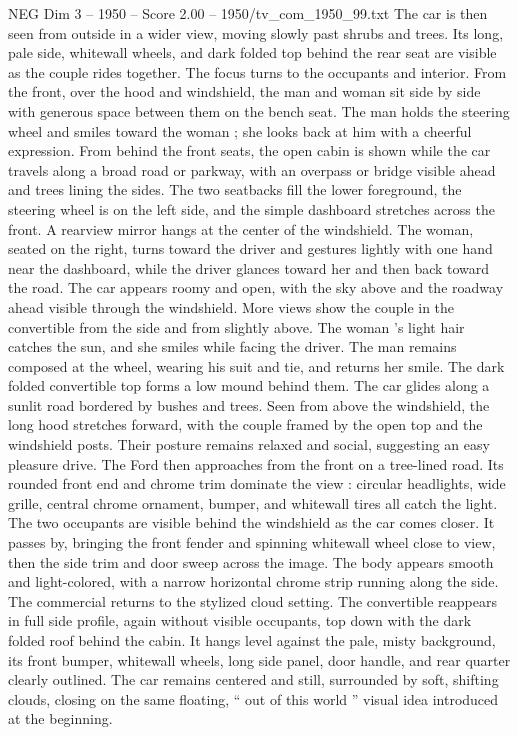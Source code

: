 \begin{textsample}{NEG Dim 3 – 1950 – Score 2.00 – 1950/tv\_com\_1950\_99.txt}
The car is then seen from outside in a wider view, moving slowly past shrubs and trees.
Its long, pale side, whitewall wheels, and dark folded top behind the rear seat are visible as the couple rides together.
The focus turns to the occupants and interior.
From the front, over the hood and windshield, the man and woman sit side by side with generous space between them on the bench seat.
The man holds the steering wheel and smiles toward the woman ; she looks back at him with a cheerful expression.
From behind the front seats, the open cabin is shown while the car travels along a broad road or parkway, with an overpass or bridge visible ahead and trees lining the sides.
The two seatbacks fill the lower foreground, the steering wheel is on the left side, and the simple dashboard stretches across the front.
A rearview mirror hangs at the center of the windshield.
The woman, seated on the right, turns toward the driver and gestures lightly with one hand near the dashboard, while the driver glances toward her and then back toward the road.
The car appears roomy and open, with the sky above and the roadway ahead visible through the windshield.
More views show the couple in the convertible from the side and from slightly above.
The woman ’s light hair catches the sun, and she smiles while facing the driver.
The man remains composed at the wheel, wearing his suit and tie, and returns her smile.
The dark folded convertible top forms a low mound behind them.
The car glides along a sunlit road bordered by bushes and trees.
Seen from above the windshield, the long hood stretches forward, with the couple framed by the open top and the windshield posts.
Their posture remains relaxed and social, suggesting an easy pleasure drive.
The Ford then approaches from the front on a tree-lined road.
Its rounded front end and chrome trim dominate the view : circular headlights, wide grille, central chrome ornament, bumper, and whitewall tires all catch the light.
The two occupants are visible behind the windshield as the car comes closer.
It passes by, bringing the front fender and spinning whitewall wheel close to view, then the side trim and door sweep across the image.
The body appears smooth and light-colored, with a narrow horizontal chrome strip running along the side.
The commercial returns to the stylized cloud setting.
The convertible reappears in full side profile, again without visible occupants, top down with the dark folded roof behind the cabin.
It hangs level against the pale, misty background, its front bumper, whitewall wheels, long side panel, door handle, and rear quarter clearly outlined.
The car remains centered and still, surrounded by soft, shifting clouds, closing on the same floating, “ out of this world ” visual idea introduced at the beginning.

\end{textsample}
